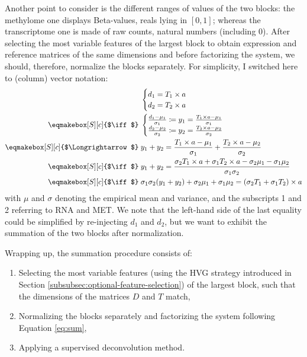 \documentclass{article}
\newcommand\alignsymbols[2][c]{\mathrel{\eqmakebox[S][#1]{$#2$}}{}}
\begin{document}
Another point to consider is the different ranges of values of the two blocks: the methylome one displays Beta-values, reals lying in $[0, 1]$; whereas the transcriptome one is made of raw counts, natural numbers (including 0).
After selecting the most variable features of the largest block to obtain expression and reference matrices of the same dimensions and before factorizing the system, we should, therefore, normalize the blocks separately.
For simplicity, I switched here to (column) vector notation:
\begin{equation}
\label{eq:sum}
\begin{split}
    &
    \begin{cases}
      d_1 = T_1 \times a \\
      d_2 = T_2 \times a
    \end{cases} \\
    \alignsymbols{\iff} &
    \begin{cases}
      \frac{d_1 - \mu_1}{\sigma_1} \coloneqq y_1 = \frac{T_1 \times a - \mu_1}{\sigma_1} \\
      \frac{d_2 - \mu_2}{\sigma_2} \coloneqq y_2 = \frac{T_2 \times a - \mu_2}{\sigma_2}
    \end{cases} \\
    \alignsymbols[c]{\Longrightarrow} & y_1 + y_2 = \frac{T_1 \times a - \mu_1}{\sigma_1} + \frac{T_2 \times a - \mu_2}{\sigma_2} \\
    \alignsymbols{\iff} & y_1 + y_2 = \frac{\sigma_2 T_1 \times a + \sigma_1 T_2 \times a - \sigma_2 \mu_1 - \sigma_1 \mu_2}{\sigma_1 \sigma_2} \\
    \alignsymbols{\iff} & \sigma_1 \sigma_2 (y_1 + y_2) + \sigma_2 \mu_1 + \sigma_1 \mu_2 = (\sigma_2 T_1 + \sigma_1 T_2) \times a
\end{split}
\end{equation}
with $\mu$ and $\sigma$ denoting the empirical mean and variance, and the subscripts 1 and 2 referring to RNA and MET.
We note that the left-hand side of the last equality could be simplified by re-injecting $d_1$ and $d_2$, but we want to exhibit the summation of the two blocks after normalization.

Wrapping up, the summation procedure consists of:
\begin{enumerate}
    \item Selecting the most variable features (using the HVG strategy introduced in Section \ref{subsubsec:optional-feature-selection}) of the largest block, such that the dimensions of the matrices $D$ and $T$ match,
    \item Normalizing the blocks separately and factorizing the system following Equation \ref{eq:sum},
    \item Applying a supervised deconvolution method.
\end{enumerate}
\end{document}
